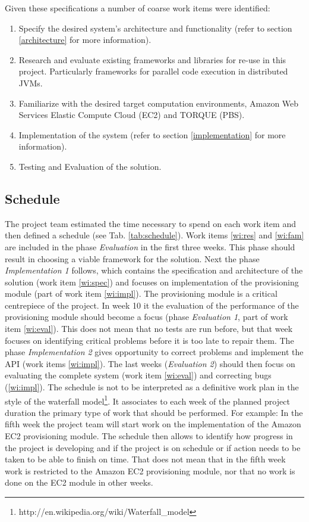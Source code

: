 \documentclass{article}
\begin{document}
Given these specifications a number of coarse work items were identified:
\begin{enumerate}
\item \label{wi:spec}Specify the desired system's architecture and functionality (refer to section \ref{architecture} for more information).
\item \label{wi:res}Research and evaluate existing frameworks and libraries for re-use in this project. Particularly frameworks for parallel code execution in distributed JVMs.
\item \label{wi:fam}Familiarize with the desired target computation environments, Amazon Web Services Elastic Compute Cloud (EC2) and TORQUE (PBS).
\item \label{wi:impl}Implementation of the system (refer to section \ref{implementation} for more information).
\item \label{wi:eval}Testing and Evaluation of the solution.
\end{enumerate}

\subsection{Schedule}

The project team estimated the time necessary to spend on each work item and then defined a schedule (see Tab. \ref{tab:schedule}). Work items \ref{wi:res} and \ref{wi:fam} are included in the phase \emph{Evaluation} in the first three weeks. This phase should result in choosing a viable framework for the solution. Next the phase \emph{Implementation 1} follows, which contains the specification and architecture of the solution (work item \ref{wi:spec}) and focuses on implementation of the provisioning module (part of work item \ref{wi:impl}). The provisioning module is a critical centrepiece of the project. In week 10 it the evaluation of the performance of the provisioning module should become a focus (phase \emph{Evaluation 1}, part of work item \ref{wi:eval}). This does not mean that no tests are run before, but that week focuses on identifying critical problems before it is too late to repair them. The phase \emph{Implementation 2} gives opportunity to correct problems and implement the API (work items \ref{wi:impl}). The last weeks (\emph{Evaluation 2}) should then focus on evaluating the complete system (work item \ref{wi:eval}) and correcting bugs (\ref{wi:impl}). The schedule is not to be interpreted as a definitive work plan in the style of the waterfall model\footnote{http://en.wikipedia.org/wiki/Waterfall\_model}. It associates to each week of the planned project duration the primary type of work that should be performed. For example: In the fifth week the project team will start work on the implementation of the Amazon EC2 provisioning module. The schedule then allows to identify how progress in the project is developing and if the project is on schedule or if action needs to be taken to be able to finish on time. That does not mean that in the fifth week work is restricted to the Amazon EC2 provisioning module, nor that no work is done on the EC2 module in other weeks.
\end{document}
